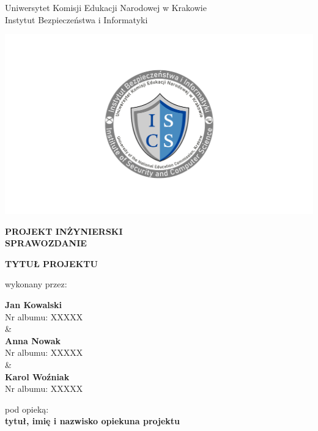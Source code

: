 \documentclass[12pt,a4paper,oneside]{article}
\theoremstyle{definition}
\numberwithin{equation}{section}
\begin{document}

\thispagestyle{empty}
\begin{titlepage}
\begin{center}\Large
Uniwersytet Komisji Edukacji Narodowej w Krakowie\\
\large
Instytut Bezpieczeństwa i Informatyki\\
\vskip 10pt
\end{center}
\begin{center}
\centering \includegraphics[width=1.0\columnwidth]{images/logo.png }
\end{center}

\begin{center}
 {\bf \fontsize{14pt}{14pt}\selectfont PROJEKT INŻYNIERSKI \\ SPRAWOZDANIE}
\end{center}
\vskip 5pt
\begin{center}
 {\bf \fontsize{22pt}{22pt}\selectfont TYTUŁ PROJEKTU}
\end{center}

\begin{center}
 {\fontsize{12pt}{12pt}\selectfont wykonany przez: }
\end{center}
\begin{center}
 {\bf\fontsize{16pt}{16pt}\selectfont Jan Kowalski}\\
 {\fontsize{12pt}{12pt}\selectfont Nr albumu: XXXXX \\\&\\}
 {\bf\fontsize{16pt}{16pt}\selectfont Anna Nowak}\\
 {\fontsize{12pt}{12pt}\selectfont Nr albumu: XXXXX\\\&\\}
 {\bf\fontsize{16pt}{16pt}\selectfont Karol Woźniak}\\
 {\fontsize{12pt}{12pt}\selectfont Nr albumu: XXXXX}
\end{center}
\begin{center}
 {\fontsize{12pt}{12pt}\selectfont pod opieką:}\\
 {\bf\fontsize{12pt}{12pt}\selectfont tytuł, imię i nazwisko opiekuna projektu}
\end{center}


\end{titlepage}
\end{document}
